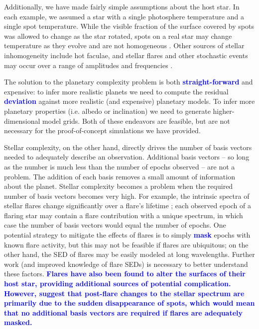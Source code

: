\documentclass[twocolumn,linenumbers]{aastex7}
\newcommand{\update}[1]{\textcolor{blue}{\bf #1}}
\begin{document}
Additionally, we have made fairly simple assumptions about the host star. In each example, we assumed a star with a single photosphere temperature and a single spot temperature. While the visible fraction of the surface covered by spots was allowed to change as the star rotated, spots on a real star may change temperature as they evolve and are not homogeneous \citep[e.g. sunspots, see][]{solanki2003}. Other sources of stellar inhomogeneity include hot faculae, and stellar flares and other stochastic events may occur over a range of amplitudes and frequencies \citep[e.g.][]{spruit1976,topka1997,magic2014,gordon2020,hovis-afflerbach2022,gao2022}.

The solution to the planetary complexity problem is both \update{straight-forward} and expensive: to infer more realistic planets we need to compute the residual \update{deviation} against more realistic (and expensive) planetary models. To infer more planetary properties (i.e. albedo or inclination) we need to generate higher-dimensional model grids. Both of these endeavors are feasible, but are not necessary for the proof-of-concept simulations we have provided.

Stellar complexity, on the other hand, directly drives the number of basis vectors needed to adequately describe an observation. Additional basis vectors -- so long as the number is much less than the number of epochs observed -- are not a problem. The addition of each basis removes a small amount of information about the planet. Stellar complexity becomes a problem when the required number of basis vectors becomes very high. For example, the intrinsic spectra of stellar flares change significantly over a flare's lifetime \citep{howard2025}; each observed epoch of a flaring star may contain a flare contribution with a unique spectrum, in which case the number of basis vectors would equal the number of epochs. One potential strategy to mitigate the effects of flares is to simply \update{mask} epochs with known flare activity, but this may not be feasible if flares are ubiquitous; on the other hand, the SED of flares may be easily modeled at long wavelengths. Further work (and improved knowledge of flare SEDs) is necessary to better understand these factors.
\update{Flares have also been found to alter the surfaces of their host star, providing additional sources of potential complication. However, \citet{vasilyev2025} suggest that post-flare changes to the stellar spectrum are primarily due to the sudden disappearance of spots, which would mean that no additional basis vectors are required if flares are adequately masked.}
\end{document}
